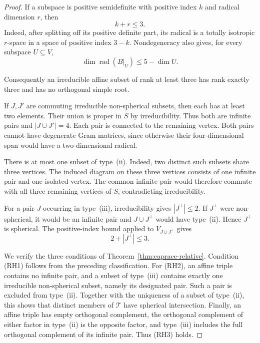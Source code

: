 \documentclass[11pt,reqno]{amsart}
\theoremstyle{plain}
\theoremstyle{definition}
\theoremstyle{remark}
\numberwithin{equation}{section}
\begin{document}
\begin{proof}
If a subspace is positive semidefinite with positive index $k$
and radical dimension $r$, then
\[
    k+r\leq3.
\]
Indeed, after splitting off its positive definite part,
its radical is a totally isotropic $r$-space in a space
of positive index $3-k$.
Nondegeneracy also gives, for every subspace $U\subseteq V$,
\[
    \dim\operatorname{rad}(B|_U)\leq5-\dim U.
\]

Consequently an irreducible affine subset of rank at least
three has rank exactly three and has no orthogonal simple
root.

If $J,J'$ are commuting irreducible non-spherical subsets,
then each has at least two elements.
Their union is proper in $S$ by irreducibility.
Thus both are infinite pairs and $|J\cup J'|=4$.
Each pair is connected to the remaining vertex.
Both pairs cannot have degenerate Gram matrices, since
otherwise their four-dimensional span would have a
two-dimensional radical.

There is at most one subset of type~\textup{(ii)}.
Indeed, two distinct such subsets share three vertices.
The induced diagram on these three vertices consists of
one infinite pair and one isolated vertex.
The common infinite pair would therefore commute with
all three remaining vertices of $S$, contradicting
irreducibility.

For a pair $J$ occurring in type~\textup{(iii)},
irreducibility gives $|J^\perp|\leq2$.
If $J^\perp$ were non-spherical, it would be an infinite
pair and $J\cup J^\perp$ would have type~\textup{(ii)}.
Hence $J^\perp$ is spherical.
The positive-index bound applied to $V_{J\cup J^\perp}$
gives
\[
    2+|J^\perp|\leq3.
\]

We verify the three conditions of Theorem~\ref{thm:caprace-relative}.
Condition \textup{(RH1)} follows from the preceding
classification.
For \textup{(RH2)}, an affine triple contains no infinite
pair, and a subset of type~\textup{(iii)} contains exactly
one irreducible non-spherical subset, namely its designated
pair.
Such a pair is excluded from type~\textup{(ii)}.
Together with the uniqueness of a subset of
type~\textup{(ii)}, this shows that distinct members of
$\mathcal T$ have spherical intersection.
Finally, an affine triple has empty orthogonal complement,
the orthogonal complement of either factor in
type~\textup{(ii)} is the opposite factor, and
type~\textup{(iii)} includes the full orthogonal complement
of its infinite pair.
Thus \textup{(RH3)} holds.
\end{proof}
\end{document}

